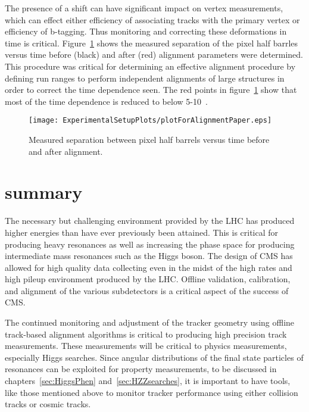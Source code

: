 The presence of a shift can have significant impact on vertex measurements,
which can effect either efficiency of associating tracks with the primary
vertex or efficiency of b-tagging. Thus monitoring and correcting
these deformations in time is critical.  Figure~\ref{fig:DzVStime} shows the 
measured separation of the pixel half barrles versus time before (black)
and after (red) alignment parameters were determined.  This procedure
was critical for determining an effective alignment procedure by defining
run ranges to perform independent alignments of large structures in order to 
correct the time dependence seen.  The red points in figure~\ref{fig:DzVStime}
show that most of the time dependence is reduced to below 5-10~\microns.

\begin{figure}
\begin{center}
\texttt{[image: ExperimentalSetupPlots/plotForAlignmentPaper.eps]}
\caption{Measured separation between pixel half barrels versus time
before and after alignment.}
\label{fig:DzVStime}
\end{center}
\end{figure}

\section{summary}

The necessary but challenging environment provided by the LHC has produced higher energies than have ever previously been attained.  This is critical for 
producing heavy resonances as well as increasing the phase space
for producing intermediate mass resonances such as the Higgs boson.  
The design of CMS has allowed for high quality data collecting even in the midst 
of the high rates and high pileup environment produced by the LHC.  Offline validation,
calibration, and alignment of the various subdetectors is a critical 
aspect of the success of CMS.  

The continued monitoring and adjustment of the tracker geometry using offline
track-based alignment algorithms is critical to producing high precision
track measurements.  These measurements will be critical to physics measurements,
especially Higgs searches.  Since angular distributions of the final state 
particles of resonances can be exploited for property measurements, to be
discussed in chapters~\ref{sec:HiggsPhen} and~\ref{sec:HZZsearches}, it is 
important to have tools, like those mentioned above to monitor tracker 
performance using either collision tracks or cosmic tracks.
